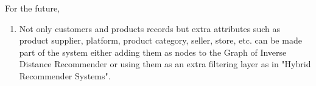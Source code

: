 For the future,
\begin{enumerate}
	\item Not only customers and products records but extra attributes such as product supplier, platform, product category, seller, store, etc. can be made part of the system either adding them as nodes to the Graph of Inverse Distance Recommender or using them as an extra filtering layer as in "Hybrid Recommender Systems".
\end{enumerate}